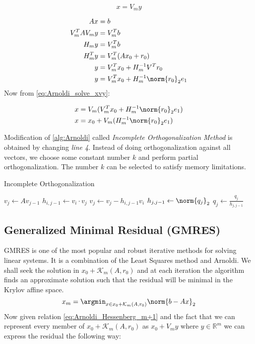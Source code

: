 \begin{equation}\label{eq:Arnoldi_solve_xvy}
	x = V_my
\end{equation}

\begin{align}
	Ax &= b \\
	V^T_mAV_my &= V^T_mb \\
	H_my &= V^T_mb \\
	H^T_my &= V^T_m(Ax_0 + r_0) \\
	y &= V^T_mx_0 + H^{-1}_mV^Tr_0 \\
	y &= V^T_mx_0 + H^{-1}_m\norm{r_0}_2e_1
\end{align}
Now from \cref{eq:Arnoldi_solve_xvy}:

\begin{align}
	x &= V_m(V^T_mx_0 + H^{-1}_m\norm{r_0}_2e_1) \\
	x &= x_0 + V_m(H^{-1}_m\norm{r_0}_2e_1)
\end{align}

Modification of \cref{alg:Arnoldi} called \textit{Incomplete Orthogonalization Method} is obtained by changing \textit{line 4}. Instead of doing orthogonalization against all vectors, we choose some constant number $k$ and perform partial orthogonalization. The number $k$ can be selected to satisfy memory limitations.

\begin{algorithm}[H]
 \centering
 \caption{Incomplete Orthogonalization}\label{alg:Incomplete_Orthogonalization}
 \begin{algorithmic}[1]
				\State $v_j \gets Av_{j-1}$
					\State $h_{i,j-1} \gets v_i \cdot v_j$
					\State $v_j \gets v_j - h_{i,j-1} v_i$
				\EndFor
				\State $h_{j,j-1} \gets \norm{q_j}_2$
				\State $q_j \gets \frac{q_j}{h_{j,j-1}}$
			\EndFor
		\EndProcedure
 \end{algorithmic}
\end{algorithm}

\subsection{Generalized Minimal Residual (GMRES)}
GMRES is one of the most popular and robust iterative methods for solving linear systems. It is a combination of the Least Squares method and Arnoldi. We shall seek the solution in $x_0 + \mathcal{K}_{m}(A, r_0)$ and at each iteration the algorithm finds an approximate solution such that the residual will be minimal in the Krylov affine space.
\begin{equation}\label{eq:GMRES_basic}
	x_m = \argmin_{x \in x_0 + \mathcal{K}_{m}(A, r_0)} \norm{b - Ax}_2
\end{equation}
Now given relation \cref{eq:Arnoldi_Hessenberg_m+1} and the fact that we can represent every member of $x_0 + \mathcal{K}_{m}(A, r_0)$ as $x_0 + V_my$ where $y \in \mathbb{R}^m$ we can express the residual the following way:

